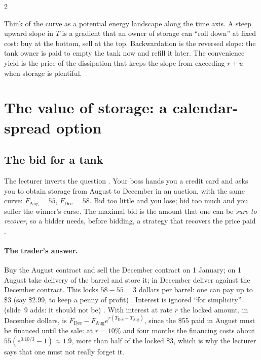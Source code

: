 \begin{paracol}{2}
\begin{intuition}
Think of the curve as a potential energy landscape along the time axis. A steep upward slope in $T$ is a gradient that an owner of storage can ``roll down'' at fixed cost: buy at the
bottom, sell at the top. Backwardation is the reversed slope: the tank owner is paid to empty the tank now and refill it later. The convenience yield is the price of the dissipation that keeps
the slope from exceeding $r+u$ when storage is plentiful.
\end{intuition}

\section{The value of storage: a calendar-spread option}\label{ch21:sec-spread}

\subsection{The bid for a tank}
The lecturer inverts the question . Your boss hands you a credit card and asks you to obtain storage from August to December in an auction, with the same
curve: $F_{\mathrm{Aug}}=55$, $F_{\mathrm{Dec}}=58$. Bid too little and you lose; bid too much and you suffer the winner's curse. The maximal bid is the amount that one can be \emph{sure to recover},
so a bidder needs, before bidding, a strategy that recovers the price paid .

\paragraph{The trader's answer.} Buy the August contract and sell the December contract on 1 January; on 1 August take delivery of the barrel and store it; in December deliver against the
December contract. This locks $58-55=3$ dollars per barrel: one can pay up to \$3 (say \$2.99, to keep a penny of profit) . Interest is ignored
``for simplicity'' (slide~9 adds: it should not be) . With interest at rate $r$ the locked amount, in December dollars, is $F_{\mathrm{Dec}}-F_{\mathrm{Aug}}e^{r(T_{\mathrm{Dec}}-T_{\mathrm{Aug}})}$, since the \$55 paid in August must be financed until the sale: at $r=10\%$ and four months the financing costs about
$55(e^{0.10/3}-1)\approx1.9$, more than half of the locked \$3, which is why the lecturer says that one must not really forget it.


\end{paracol}
